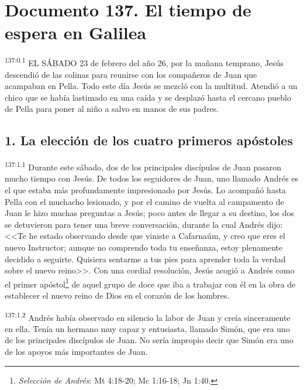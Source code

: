 \chapter{Documento 137. El tiempo de espera en Galilea}
\par 
\textsuperscript{137:0.1} EL SÁBADO 23 de febrero del año 26, por la mañana temprano, Jesús descendió de las colinas para reunirse con los compañeros de Juan que acampaban en Pella. Todo este día Jesús se mezcló con la multitud. Atendió a un chico que se había lastimado en una caída y se desplazó hasta el cercano pueblo de Pella para poner al niño a salvo en manos de sus padres.

\section*{1. La elección de los cuatro primeros apóstoles}
\par 
\textsuperscript{137:1.1} Durante este sábado, dos de los principales discípulos de Juan pasaron mucho tiempo con Jesús. De todos los seguidores de Juan, uno llamado Andrés es el que estaba más profundamente impresionado por Jesús. Lo acompañó hasta Pella con el muchacho lesionado, y por el camino de vuelta al campamento de Juan le hizo muchas preguntas a Jesús; poco antes de llegar a su destino, los dos se detuvieron para tener una breve conversación, durante la cual Andrés dijo: <<Te he estado observando desde que viniste a Cafarnaúm, y creo que eres el nuevo Instructor; aunque no comprendo toda tu enseñanza, estoy plenamente decidido a seguirte. Quisiera sentarme a tus pies para aprender toda la verdad sobre el nuevo reino>>. Con una cordial resolución, Jesús acogió a Andrés como el primer apóstol\footnote{\textit{Selección de Andrés}: Mt 4:18-20; Mc 1:16-18; Jn 1:40.} de aquel grupo de doce que iba a trabajar con él en la obra de establecer el nuevo reino de Dios en el corazón de los hombres.

\par 
\textsuperscript{137:1.2} Andrés había observado en silencio la labor de Juan y creía sinceramente en ella. Tenía un hermano muy capaz y entusiasta, llamado Simón, que era uno de los principales discípulos de Juan. No sería impropio decir que Simón era uno de los apoyos más importantes de Juan.

